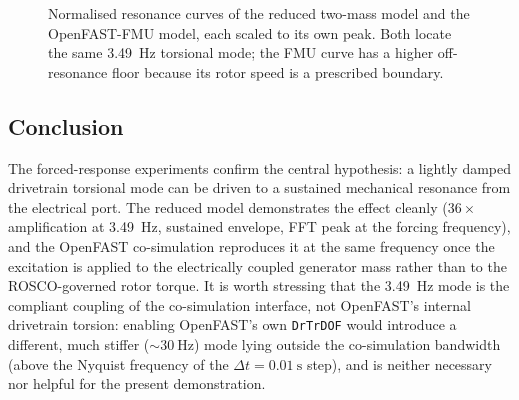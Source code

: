 \begin{figure}[t]
  \centering
  \caption{Normalised resonance curves of the reduced two-mass model and the
  OpenFAST-FMU model, each scaled to its own peak. Both locate the same
  \SI{3.49}{\hertz} torsional mode; the FMU curve has a higher off-resonance
  floor because its rotor speed is a prescribed boundary.}
  \label{fig:fr-comparison}
\end{figure}

\subsection{Conclusion}
\label{subsec:fr-conclusion}

The forced-response experiments confirm the central hypothesis: a lightly
damped drivetrain torsional mode can be driven to a sustained mechanical
resonance from the electrical port. The reduced model demonstrates the effect
cleanly ($36\times$ amplification at \SI{3.49}{\hertz}, sustained envelope,
FFT peak at the forcing frequency), and the OpenFAST co-simulation reproduces
it at the same frequency once the excitation is applied to the electrically
coupled generator mass rather than to the ROSCO-governed rotor torque. It is
worth stressing that the \SI{3.49}{\hertz} mode is the compliant coupling of the
co-simulation interface, not OpenFAST's internal drivetrain torsion: enabling
OpenFAST's own \texttt{DrTrDOF} would introduce a different, much stiffer
($\sim\SI{30}{\hertz}$) mode lying outside the co-simulation bandwidth
(above the Nyquist frequency of the $\Delta t = \SI{0.01}{\second}$ step), and
is neither necessary nor helpful for the present demonstration.
